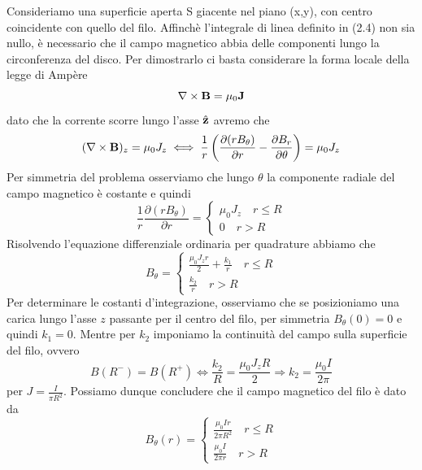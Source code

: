 Consideriamo una superficie aperta S giacente nel piano (x,y), con centro coincidente con quello del filo. Affinch\`e  l'integrale di linea definito in (2.4) non sia nullo, \`e necessario che il campo magnetico abbia delle componenti lungo la circonferenza del disco. Per dimostrarlo ci basta considerare la forma locale della legge di Amp\`ere 
\begin{equation*}
\nabla \times \bold{B} = \mu_0 \bold{J} 
\end{equation*}
dato che la corrente scorre lungo l'asse $\hat{\bold{z}}$ avremo che 
\begin{equation*}
	(\nabla \times \bold{B})_z = \mu_0 J_z \iff  \frac{1}{r} \left(\frac{\partial (rB_{\theta})}{\partial r} - \frac{\partial B_r}{\partial \theta } \right) = \mu_0J_z
\end{equation*}
Per simmetria del problema osserviamo che lungo $\theta$ la componente radiale del campo magnetico \`e costante e quindi 
\begin{equation*}
	\frac{1}{r }\frac{\partial(r B_\theta)}{\partial r} = \left \{ \begin{array}{l}
	\mu_0J_z \quad r \leq R \\
	0 \quad r > R
	\end{array}\right.
\end{equation*}
Risolvendo l'equazione differenziale ordinaria per quadrature abbiamo che 
\begin{equation*}
	B_{\theta} = \left \{ \begin{array}{l}
		\frac{\mu_0 J_z r}{2} + \frac{k_1}{r} \quad r \leq R \\
		\frac{k_2}{r} \quad r > R
	\end{array}\right.
\end{equation*}
Per determinare le costanti d'integrazione, osserviamo che se posizioniamo una carica lungo l'asse $z$ passante per il centro del filo, per simmetria $B_\theta(0) = 0$ e quindi $k_1 =0$. Mentre per $k_2$ imponiamo la continuit\`a del campo sulla superficie del filo, ovvero
\begin{equation*}
	B(R^-) = B(R^+) \iff	 \frac{k_2}{R} = \frac{\mu_0J_zR}{2} \Rightarrow k_2 = \frac{\mu_0I}{2\pi}
\end{equation*} 
per $J = \frac{I}{\pi R^2}$. Possiamo dunque concludere che il campo magnetico del filo \`e dato da 
\begin{equation*}
	B_\theta (r) = \left \{ \begin{array}{l}
		\frac{\mu_0Ir}{2 \pi R^2} \quad r \leq R \\
		\frac{\mu_0I}{2 \pi r} \quad r > R
	\end{array}\right.
\end{equation*}  
